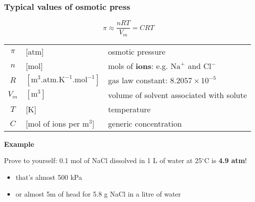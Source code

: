 \begin{frame}\frametitle{Typical values of osmotic press}
	\begin{exampleblock}{}
		\[
			\pi \approx \displaystyle \frac{nRT}{V_m} = CRT
		\]
	\end{exampleblock}
	\begin{tabular}{cll}
		$\pi$		&	[atm] 													& osmotic pressure \\
		$n$ 		&  	[mol]													& mols of \textbf{ions}: e.g. $\text{Na}^{+}$ and $\text{Cl}^{-}$\\
		$R$			&	$[\text{m}^3\text{.atm.K}^{-1}\text{.mol}^{-1}]$ 		& gas law constant: $8.2057 \times 10^{-5}$\\
		$V_m$ 		&  	$[\text{m}^{3}]$										& volume of solvent associated with solute\\
		$T$ 		&  	[K]														& temperature\\
		$C$ 		&  	[mol of ions per m$^{3}$]								& generic concentration
	\end{tabular}
	
	\vspace{12pt}
	\textbf{Example}
	
	\vspace{6pt}
	Prove to yourself: 0.1 mol of NaCl dissolved in 1 L of water at 25$^\circ$C is \textbf{4.9 atm}!
	\begin{itemize}
		\item	that's almost 500 kPa
		\item	or almost 5m of head for 5.8 g NaCl in a litre of water
	\end{itemize}
\end{frame}

